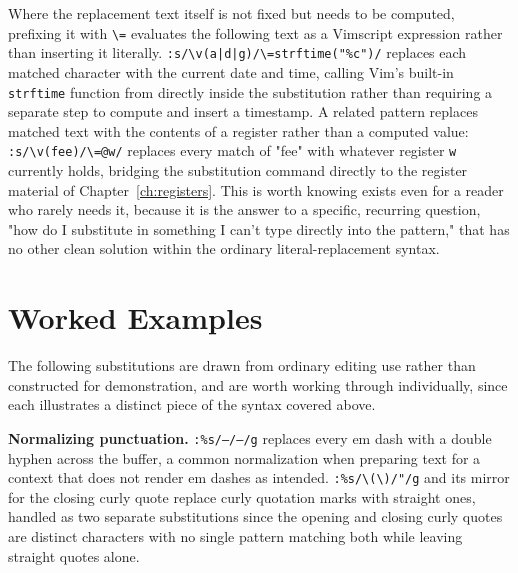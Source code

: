 Where the replacement text itself is not fixed but needs to be computed, prefixing it with \texttt{\textbackslash=} evaluates the following text as a Vimscript expression rather than inserting it literally. \texttt{:s/\textbackslash v(a|d|g)/\textbackslash=strftime("\%c")/} replaces each matched character with the current date and time, calling Vim's built-in \texttt{strftime} function from directly inside the substitution rather than requiring a separate step to compute and insert a timestamp. A related pattern replaces matched text with the contents of a register rather than a computed value: \texttt{:s/\textbackslash v(fee)/\textbackslash=@w/} replaces every match of "fee" with whatever register \texttt{w} currently holds, bridging the substitution command directly to the register material of Chapter~\ref{ch:registers}. This is worth knowing exists even for a reader who rarely needs it, because it is the answer to a specific, recurring question, "how do I substitute in something I can't type directly into the pattern," that has no other clean solution within the ordinary literal-replacement syntax.

\section{Worked Examples}

The following substitutions are drawn from ordinary editing use rather than constructed for demonstration, and are worth working through individually, since each illustrates a distinct piece of the syntax covered above.

\textbf{Normalizing punctuation.} \texttt{:\%s/---/--/g} replaces every em dash with a double hyphen across the buffer, a common normalization when preparing text for a context that does not render em dashes as intended. \texttt{:\%s/\textbackslash(\textbackslash)/"/g} and its mirror for the closing curly quote replace curly quotation marks with straight ones, handled as two separate substitutions since the opening and closing curly quotes are distinct characters with no single pattern matching both while leaving straight quotes alone.

